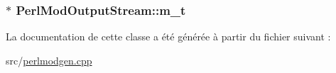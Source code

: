 \subsubsection[{m\+\_\+t}]{$\ast$ Perl\+Mod\+Output\+Stream\+::m\+\_\+t}\label{class_perl_mod_output_stream_a0000b5406fb4590ed62996f43ad3a192}


La documentation de cette classe a été générée à partir du fichier suivant \+:\begin{DoxyCompactItemize}
\item 
src/\hyperlink{perlmodgen_8cpp}{perlmodgen.\+cpp}\end{DoxyCompactItemize}
